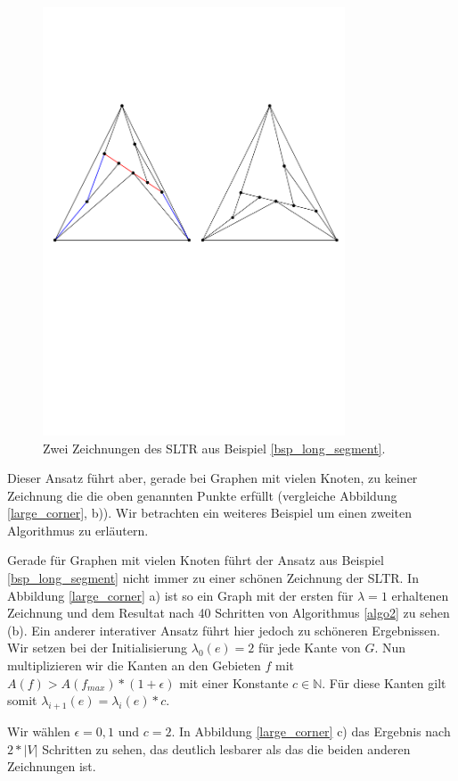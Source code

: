 \begin{figure}[h]
	\centering
  \includegraphics[width=0.8\textwidth]{example1_vis.pdf}
  \caption{Zwei Zeichnungen des SLTR aus Beispiel \ref{bsp_long_segment}.}
  \label{long_segment}
\end{figure}

Dieser Ansatz führt aber, gerade bei Graphen mit vielen Knoten, zu keiner Zeichnung die die oben genannten Punkte erfüllt (vergleiche Abbildung \ref{large_corner}, b)). Wir betrachten ein weiteres Beispiel um einen zweiten Algorithmus zu erläutern.

\begin{example}\label{bsp_large_corner} 
Gerade für Graphen mit vielen Knoten führt der Ansatz aus Beispiel \ref{bsp_long_segment} nicht immer zu einer schönen Zeichnung der SLTR. In Abbildung \ref{large_corner} a) ist so ein Graph mit der ersten für $\lambda=1$ erhaltenen Zeichnung und dem Resultat nach 40 Schritten von Algorithmus \ref{algo2} zu sehen (b). Ein anderer interativer Ansatz führt hier jedoch zu schöneren Ergebnissen. Wir setzen bei der Initialisierung $\lambda_0(e)=2$ für jede Kante von $G$. Nun multiplizieren wir die Kanten an den Gebieten $f$ mit $A(f) > A(f_{max})*(1+\epsilon)$ mit einer Konstante $c \in \mathbb{N}$. Für diese Kanten gilt somit $\lambda_{i+1}(e) = \lambda_{i}(e)*c$. 

Wir wählen $\epsilon = 0,1$ und $c=2$. In Abbildung \ref{large_corner} c) das Ergebnis nach $2*|V|$ Schritten zu sehen, das deutlich lesbarer als das die beiden anderen Zeichnungen ist.

\end{example}

